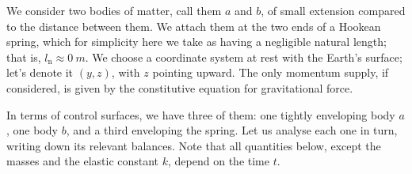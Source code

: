 \documentclass[a4paper,12pt,%
onecolumn,oneside,titlepage,%
british%
]{memoir}
\renewcommand*{\|}[1][]{\nonscript\:#1\vert\nonscript\:\mathopen{}}
\newcommand*{\ylo}{l_{\textrm{n}}}
\begin{document}
\medskip

We consider two bodies of matter, call them $a$ and $b$, of small extension compared to the distance between them. We attach them at the two ends of a Hookean spring, which for simplicity here we take as having a negligible natural length; that is, $\ylo\approx\qty{0}{m}$. We choose a coordinate system at rest with the Earth's surface; let's denote it $(y,z)$, with $z$ pointing upward. The only momentum supply, if considered, is given by the constitutive equation for gravitational force.

In terms of control surfaces, we have three of them: one tightly enveloping body $a$, one body $b$, and a third enveloping the spring. Let us analyse each one in turn, writing down its relevant balances. Note that all  quantities below, except the masses and the elastic constant $k$, depend on the time $t$.
\end{document}
